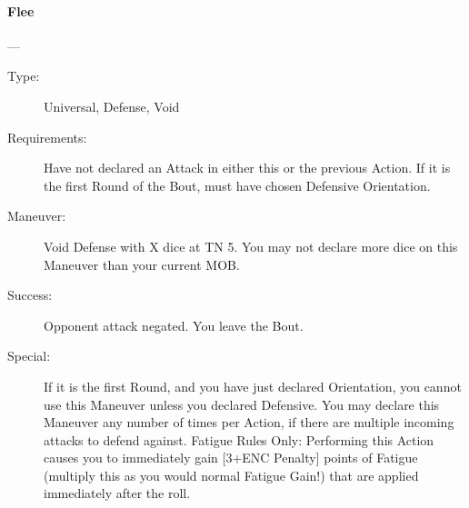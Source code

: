\documentclass[oneside,11pt,english]{book}
\begin{document}
\paragraph{\large\label{man:Flee}Flee}---
\vspace{-10pt}\begin{description} 
\item [Type:] Universal, Defense, Void 
\item [Requirements:] Have not declared an Attack in either this or the previous Action. If it is the first Round 
  of the Bout, must have chosen Defensive Orientation. 
\item [Maneuver:] Void Defense with X dice at TN 5. You may not declare more dice on this Maneuver than 
  your current MOB. 
\item [Success:] Opponent attack negated. You leave the Bout. 
\item [Special:] If it is the first Round, and you have just declared Orientation, you cannot use this Maneuver 
  unless you declared Defensive. 
  You may declare this Maneuver any number of times per Action, if there are multiple incoming attacks to 
  defend against. 
  Fatigue Rules Only: Performing this Action causes you to immediately gain [3+ENC Penalty] points of 
  Fatigue (multiply this as you would normal Fatigue Gain!) that are applied immediately after the roll. 
\end{description}
\end{document}
